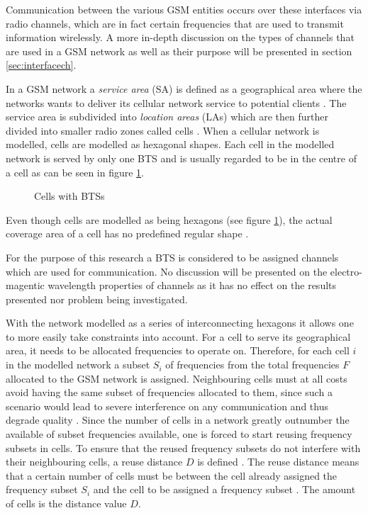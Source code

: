 Communication between the various GSM entities occurs over these interfaces via radio channels, which are in fact certain frequencies that are used to transmit information wirelessly. A more in-depth discussion on the types of channels that are used in a GSM network as well as their purpose will be presented in section \ref{sec:interfacech}.

In a GSM network a \emph{service area} (SA) is defined as a geographical area where the networks wants to deliver its cellular network service to potential clients \cite{GSMArchitectureProtocolsServices, Karen2004}. The service area is subdivided into \emph{location areas} (LAs) which are then further divided into smaller radio zones called cells \cite{GSMSecurInTeleNetwork}. When a cellular network is modelled, cells are modelled as hexagonal shapes. Each cell in the modelled network is served by only one BTS and is usually regarded to be in the centre of a cell as can be seen in figure \ref{fig:GSMCell}\cite{GSMArchitectureProtocolsServices}. 
\begin{figure}[H]
	\begin{centering}
		
		\caption{Cells with BTSs}
		\label{fig:GSMCell}
	\end{centering}
\end{figure}
Even though cells are modelled as being hexagons (see figure \ref{fig:GSMCell}), the actual coverage area of a cell has no predefined regular shape \cite{GSMArchitectureProtocolsServices}.

For the purpose of this research a BTS is considered to be assigned channels which are used for communication. No discussion will be presented on the electro-magentic wavelength properties of channels as it has no effect on the results presented nor problem being investigated.

With the network modelled as a series of interconnecting hexagons it allows one to more easily take constraints into account. For a cell to serve its geographical area, it needs to be allocated frequencies to operate on. Therefore, for each cell $i$ in the modelled network a subset $S_i$ of frequencies from the total frequencies $F$ allocated to the GSM network is assigned\cite{GSMArchitectureProtocolsServices}. Neighbouring cells must at all costs avoid having the same subset of frequencies allocated to them, since such a scenario would lead to severe interference on any communication and thus degrade quality \cite{GSMArchitectureProtocolsServices}.
Since the number of cells in a network greatly outnumber the available of subset frequencies available, one is forced to start reusing frequency subsets in cells. To ensure that the reused frequency subsets do not interfere with their neighbouring cells, a reuse distance $D$ is defined \cite{GSMArchitectureProtocolsServices}. The reuse distance means that a certain number of cells must be between the cell already assigned the frequency subset $S_i$ and the cell to be assigned a frequency subset \cite{GSMArchitectureProtocolsServices}. The amount of cells is the distance value $D$.

